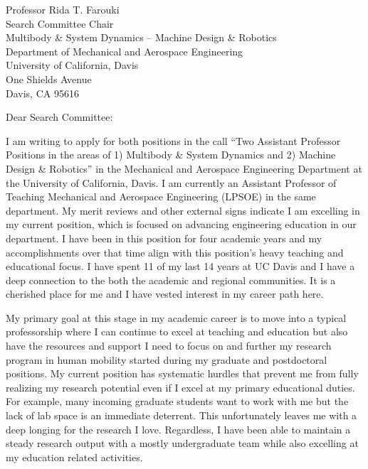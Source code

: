 \documentclass{letter}
\date{}
\begin{document}
\begin{letter}{
  Professor Rida T. Farouki \\
  Search Committee Chair \\
  Multibody \& System Dynamics -- Machine Design \& Robotics \\
  Department of Mechanical and Aerospace Engineering \\
  University of California, Davis \\
  One Shields Avenue \\
  Davis, CA 95616
}

\opening{Dear Search Committee:}

I am writing to apply for both positions in the call ``Two Assistant Professor
Positions in the areas of 1) Multibody \& System Dynamics and 2) Machine Design
\& Robotics'' in the Mechanical and Aerospace Engineering Department at the
University of California, Davis. I am currently an Assistant Professor of
Teaching Mechanical and Aerospace Engineering (LPSOE) in the same department.
My merit reviews and other external signs indicate I am excelling in my current
position, which is focused on advancing engineering education in our
department. I have been in this position for four academic years and my
accomplishments over that time align with this position's heavy teaching and
educational focus. I have spent 11 of my last 14 years at UC Davis and I have a
deep connection to the both the academic and regional communities. It is a
cherished place for me and I have vested interest in my career path here.

My primary goal at this stage in my academic career is to move into a typical
professorship where I can continue to excel at teaching and education but also
have the resources and support I need to focus on and further my research
program in human mobility started during my graduate and postdoctoral
positions. My current position has systematic hurdles that prevent me from
fully realizing my research potential even if I excel at my primary educational
duties. For example, many incoming graduate students want to work with me but
the lack of lab space is an immediate deterrent. This unfortunately leaves me
with a deep longing for the research I love. Regardless, I have been able to
maintain a steady research output with a mostly undergraduate team while also
excelling at my education related activities.


\end{letter}
\end{document}
